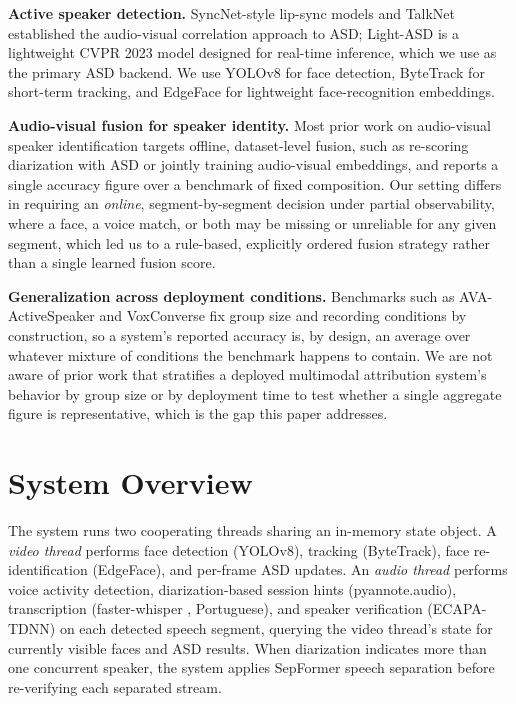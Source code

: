 \documentclass[conference]{IEEEtran}
\begin{document}
\textbf{Active speaker detection.} SyncNet-style lip-sync models
\cite{chung2017lipsync} and TalkNet \cite{tao2021talknet} established
the audio-visual correlation approach to ASD; Light-ASD
\cite{liao2023lightasd} is a lightweight CVPR 2023 model designed for
real-time inference, which we use as the primary ASD backend. We use
YOLOv8 \cite{jocher2023yolov8} for face detection, ByteTrack
\cite{zhang2022bytetrack} for short-term tracking, and EdgeFace
\cite{george2024edgeface} for lightweight face-recognition embeddings.

\textbf{Audio-visual fusion for speaker identity.} Most prior work on
audio-visual speaker identification targets offline, dataset-level
fusion, such as re-scoring diarization with ASD or jointly training
audio-visual embeddings, and reports a single accuracy figure over a
benchmark of fixed composition. Our setting differs in requiring an
\emph{online}, segment-by-segment decision under partial observability,
where a face, a voice match, or both may be missing or unreliable for
any given segment, which led us to a rule-based, explicitly ordered
fusion strategy rather than a single learned fusion score.

\textbf{Generalization across deployment conditions.} Benchmarks such
as AVA-ActiveSpeaker \cite{roth2020ava} and VoxConverse
\cite{chung2020voxconverse} fix group size and recording conditions by
construction, so a system's reported accuracy is, by design, an average
over whatever mixture of conditions the benchmark happens to contain.
We are not aware of prior work that stratifies a deployed multimodal
attribution system's behavior by group size or by deployment time to
test whether a single aggregate figure is representative, which is the
gap this paper addresses.

\section{System Overview}
\label{sec:system}

The system runs two cooperating threads sharing an in-memory state
object. A \emph{video thread} performs face detection (YOLOv8),
tracking (ByteTrack), face re-identification (EdgeFace), and per-frame
ASD updates. An \emph{audio thread} performs voice activity detection,
diarization-based session hints (pyannote.audio), transcription
(faster-whisper \cite{radford2022whisper}, Portuguese),
and speaker verification (ECAPA-TDNN) on each detected speech segment,
querying the video thread's state for currently visible faces and ASD
results. When diarization indicates more than one concurrent speaker,
the system applies SepFormer \cite{subakan2021sepformer} speech
separation before re-verifying each separated stream.
\end{document}
